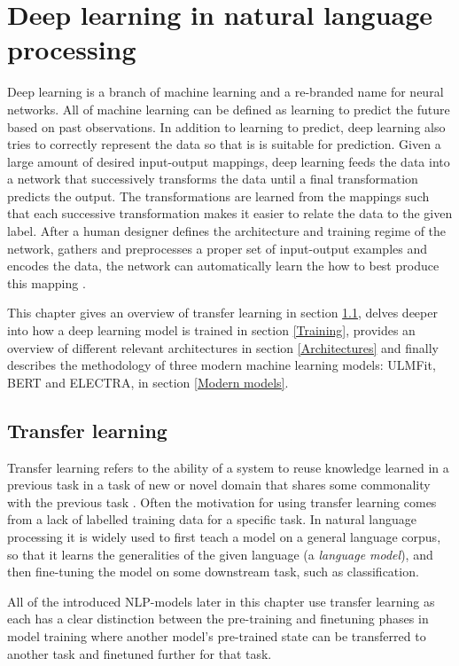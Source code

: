 \chapter{Deep learning in natural language processing} \label{Deep learning in natural language processing}
Deep learning is a branch of machine learning and a re-branded name for neural networks.
All of machine learning can be defined as learning to predict the future based on past observations.
In addition to learning to predict, deep learning also tries to correctly represent the data so that is is suitable for prediction.
Given a large amount of desired input-output mappings, deep learning feeds the data into a network that successively transforms the data until a final transformation predicts the output.
The transformations are learned from the mappings such that each successive transformation makes it easier to relate the data to the given label.
After a human designer defines the architecture and training regime of the network, gathers and preprocesses a proper set of input-output examples and encodes the data, the network can automatically learn the how to best produce this mapping \cite{goldberg2017}.

This chapter gives an overview of transfer learning in section \ref{Transfer learning}, delves deeper into how a deep learning model is trained in section \ref{Training}, provides an overview of different relevant architectures in section \ref{Architectures} and finally describes the methodology of three modern machine learning models: ULMFit, BERT and ELECTRA, in section \ref{Modern models}.

\section{Transfer learning} \label{Transfer learning}
Transfer learning refers to the ability of a system to reuse knowledge learned in a previous task in a task of new or novel domain that shares some commonality with the previous task \cite{yang2020}.
Often the motivation for using transfer learning comes from a lack of labelled training data for a specific task.
In natural language processing it is widely used to first teach a model on a general language corpus, so that it learns the generalities of the given language (a \textit{language model}), and then fine-tuning the model on some downstream task, such as classification.

All of the introduced NLP-models later in this chapter use transfer learning as each has a clear distinction between the pre-training and finetuning phases in model training where another model's pre-trained state can be transferred to another task and finetuned further for that task.

